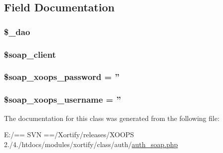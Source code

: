 \subsection{Field Documentation}
\hypertarget{class_xortify_auth_soap_a12a029c610f699b4b25e79a1f64a3485}{
\subsubsection[{\$\-\_\-dao}]{\setlength{\rightskip}{0pt plus 5cm}\$\-\_\-dao}}\label{class_xortify_auth_soap_a12a029c610f699b4b25e79a1f64a3485}
\hypertarget{class_xortify_auth_soap_a18c3d5ef7b606d5f21c8fda9d08e8c7e}{
\subsubsection[{\$soap\-\_\-client}]{\setlength{\rightskip}{0pt plus 5cm}\$soap\-\_\-client}}\label{class_xortify_auth_soap_a18c3d5ef7b606d5f21c8fda9d08e8c7e}
\hypertarget{class_xortify_auth_soap_ac116a126fa48c572acc0a859f42fa8dc}{
\subsubsection[{\$soap\-\_\-xoops\-\_\-password}]{\setlength{\rightskip}{0pt plus 5cm}\$soap\-\_\-xoops\-\_\-password = ''}}\label{class_xortify_auth_soap_ac116a126fa48c572acc0a859f42fa8dc}
\hypertarget{class_xortify_auth_soap_ab46ae973f580890282bce8dbe346abab}{
\subsubsection[{\$soap\-\_\-xoops\-\_\-username}]{\setlength{\rightskip}{0pt plus 5cm}\$soap\-\_\-xoops\-\_\-username = ''}}\label{class_xortify_auth_soap_ab46ae973f580890282bce8dbe346abab}


The documentation for this class was generated from the following file\-:\begin{DoxyCompactItemize}
\item 
E\-:/== S\-V\-N ==/\-Xortify/releases/\-X\-O\-O\-P\-S 2./4./htdocs/modules/xortify/class/auth/\hyperlink{auth__soap_8php}{auth\-\_\-soap.\-php}\end{DoxyCompactItemize}
